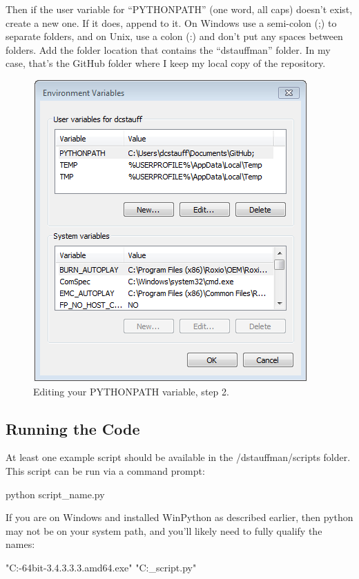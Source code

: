 \documentclass[12pt]{article}
\begin{document}
Then if the user variable for ``PYTHONPATH'' (one word, all caps) doesn't exist, create a new one. If it does, append to it.  On Windows use a semi-colon (;) to separate folders, and on Unix, use a colon (:) and don't put any spaces between folders.  Add the folder location that contains the ``dstauffman'' folder.  In my case, that's the GitHub folder where I keep my local copy of the repository.

\begin{figure}[H]
    \centering
    \includegraphics[width=.6\textwidth]{Environment_Variables2.png}
    \caption{Editing your PYTHONPATH variable, step 2.}
    \label{fig:environment2}
\end{figure}


\subsection{Running the Code}\label{h2:Running_the_code}
At least one example script should be available in the /dstauffman/scripts folder.  This script can be run via a command prompt:
\begin{PlainText}
python script_name.py
\end{PlainText}

If you are on Windows and installed WinPython as described earlier, then python may not be on your system path, and you'll likely need to fully qualify the names:
\begin{PlainText}
"C:\Programs\WinPython-64bit-3.4.3.3.3.amd64\python.exe" 
  "C:\Users\dcstauff\Documents\GitHub\dstauffman\scripts\example_script.py"
\end{PlainText}
\end{document}
